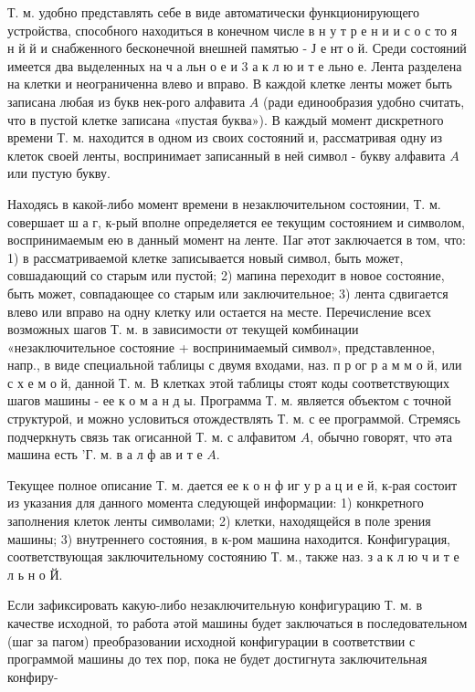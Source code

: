 \documentclass[10pt]{article}
\begin{document}
Т. м. удобно представлять себе в виде автоматически функционирующего устройства, способного находиться в конечном числе в н у т р е н и и с о с то я н й й и снабженного бесконечной внешней памятью - Ј е нт о й. Среди состояний имеется два выделенных на ч а льн о е и 3 а к л ю и т е льно е. Лента разделена на клетки и неограниченна влево и вправо. В каждой клетке ленты может быть записана любая из букв нек-рого алфавита $A$ (ради единообразия удобно считать, что в пустой клетке записана «пустая буква»). В каждый момент дискретного времени Т. м. находится в одном из своих состояний и, рассматривая одну из клеток своей ленты, воспринимает записанный в ней символ - букву алфавита $A$ или пустую букву.



Находясь в какой-либо момент времени в незаключительном состоянии, Т. м. совершает ш а г, к-рый вполне определяется ее текущим состоянием и символом, воспринимаемым ею в данный момент на ленте. IIаг әтот заключается в том, что: 1) в рассматриваемой клетке записывается новый символ, быть может, совшадающий со старым или пустой; 2) мапина переходит в новое состояние, быть может, совпадающее со старым или заключительное; 3) лента сдвигается влево или вправо на одну клетку или остается на месте. Перечисление всех возможных шагов Т. м. в зависимости от текущей комбинации «незаключительное состояние + воспринимаемый символ», представленное, напр., в виде специальной таблицы с двумя входами, наз. п р ог р а м м о й, или с х е м о й, данной Т. м. В клетках этой таблицы стоят коды соответствующих шагов машины - ее к о м а н д ы. Программа Т. м. является объектом с точной структурой, и можно условиться отождествлять Т. м. с ее программой. Стремясь подчеркнуть связь так огисанной Т. м. с алфавитом $A$, обычно говорят, что әта машина есть 'Г. м. в а л ф ав и т е $A$.



Текущее полное описание Т. м. дается ее к о н ф иг у р а ц и е й, к-рая состоит из указания для данного момента следующей информации: 1) конкретного заполнения клеток ленты символами; 2) клетки, находящейся в поле зрения машины; 3) внутреннего состояния, в к-ром машина находится. Конфигурация, соответствующая заключительному состоянию Т. м., также наз. з а к л ю ч и т е л ь н о Й.



Если зафиксировать какую-либо незаключительную конфигурацию Т. м. в качестве исходной, то работа әтой машины будет заключаться в последовательном (шаг за пагом) преобразовании исходной конфигурации в соответствии с программой машины до тех пор, пока не будет достигнута заключительная конфиру-
\end{document}
